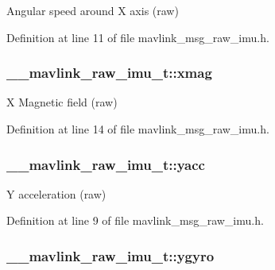 Angular speed around X axis (raw) 



Definition at line 11 of file mavlink\-\_\-msg\-\_\-raw\-\_\-imu.\-h.

\hypertarget{struct____mavlink__raw__imu__t_a4aa7dda8a63c114e2b60e5d9f767b9ba}{
\subsubsection[{xmag}]{ \-\_\-\-\_\-mavlink\-\_\-raw\-\_\-imu\-\_\-t\-::xmag}}\label{struct____mavlink__raw__imu__t_a4aa7dda8a63c114e2b60e5d9f767b9ba}


X Magnetic field (raw) 



Definition at line 14 of file mavlink\-\_\-msg\-\_\-raw\-\_\-imu.\-h.

\hypertarget{struct____mavlink__raw__imu__t_a5080c838e03f9ed2237fffbfd26ff1a3}{
\subsubsection[{yacc}]{ \-\_\-\-\_\-mavlink\-\_\-raw\-\_\-imu\-\_\-t\-::yacc}}\label{struct____mavlink__raw__imu__t_a5080c838e03f9ed2237fffbfd26ff1a3}


Y acceleration (raw) 



Definition at line 9 of file mavlink\-\_\-msg\-\_\-raw\-\_\-imu.\-h.

\hypertarget{struct____mavlink__raw__imu__t_aff358c8fc1fb40d5862c7367d4bf80e9}{
\subsubsection[{ygyro}]{ \-\_\-\-\_\-mavlink\-\_\-raw\-\_\-imu\-\_\-t\-::ygyro}}\label{struct____mavlink__raw__imu__t_aff358c8fc1fb40d5862c7367d4bf80e9}



